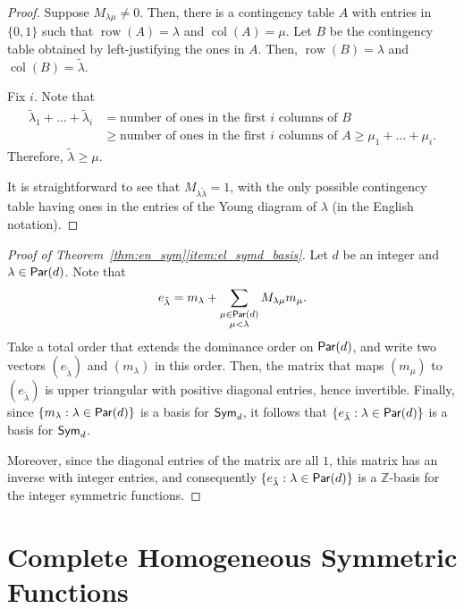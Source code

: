 \begin{proof}
	Suppose \(M_{\lambda\mu} \neq 0\).
	Then, there is a contingency table \(A\) with entries in \(\{0, 1\}\) such that \(\operatorname{row}(A) = \lambda\) and \(\operatorname{col}(A) = \mu\).
	Let \(B\) be the contingency table obtained by left-justifying the ones in \(A\).
	Then, \(\operatorname{row}(B) = \lambda\) and \(\operatorname{col}(B) = \tilde{\lambda}\).

	Fix \(i\).
	Note that
	\begin{align}
		\tilde{\lambda}_1 + \dots + \tilde{\lambda}_i
		 & = \text{number of ones in the first \(i\) columns of \(B\)}    \\
		 & \geq \text{number of ones in the first \(i\) columns of \(A\)}
		\geq \mu_1 + \dots + \mu_i.
	\end{align}
	Therefore, \(\tilde{\lambda} \geq \mu\).

	It is straightforward to see that \(M_{\lambda\tilde{\lambda}} = 1\), with the only possible contingency table having ones in the entries of the Young diagram of \(\lambda\) (in the English notation).
\end{proof}

\begin{proof}[Proof of Theorem~\ref{thm:en_sym}\ref{item:el_symd_basis}]
    Let \(d\) be an integer and \(\lambda \in \operatorname{\mathsf{Par}}(d)\).
    Note that
    \begin{equation*}
        e_{\tilde{\lambda}}
        = m_\lambda + \sum_{\substack{\mu \in \operatorname{\mathsf{Par}}(d) \\ \mu < \lambda}} M_{\lambda\mu} m_\mu.
    \end{equation*}
    Take a total order that extends the dominance order on \(\operatorname{\mathsf{Par}}(d)\),
    and write two vectors \((e_{\tilde{\lambda}})\) and \((m_\lambda)\) in this order.
    Then, the matrix that maps \((m_\mu)\) to \((e_{\tilde{\lambda}})\) is upper triangular with positive diagonal entries, hence invertible.
    Finally, since \(\{m_\lambda : \lambda \in \operatorname{\mathsf{Par}}(d)\}\) is a basis for \(\operatorname{\mathsf{Sym}}_d\), it follows that \(\{e_{\tilde{\lambda}} : \lambda \in \operatorname{\mathsf{Par}}(d)\}\) is a basis for \(\operatorname{\mathsf{Sym}}_d\).

    Moreover, since the diagonal entries of the matrix are all \(1\), this matrix has an inverse with integer entries, and consequently \(\{e_{\tilde{\lambda}} : \lambda \in \operatorname{\mathsf{Par}}(d)\}\) is a \(\mathbb{Z}\)-basis for the integer symmetric functions.
\end{proof}


\section{Complete Homogeneous Symmetric Functions}

